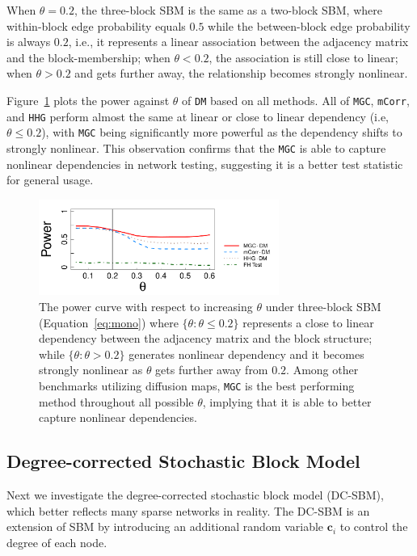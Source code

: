 \documentclass[12pt]{article}
\theoremstyle{definition}
\begin{document}
	When $\theta = 0.2$, the three-block SBM is the same as a two-block SBM, where within-block edge probability equals $0.5$ while the between-block edge probability is always $0.2$, i.e., it represents a linear association between the adjacency matrix and the block-membership; when $\theta<0.2$, the association is still close to linear; when $\theta > 0.2$ and gets further away, the relationship becomes strongly nonlinear.
	
	Figure~\ref{fig:powerplot} plots the power against $\theta$ of \texttt{DM} based on all methods. All of \texttt{MGC}, \texttt{mCorr}, and \texttt{HHG} perform almost the same at linear or close to linear dependency (i.e, $\theta \leq 0.2$), with \texttt{MGC} being significantly more powerful as the dependency shifts to strongly nonlinear. This observation confirms that the \texttt{MGC} is able to capture nonlinear dependencies in network testing, suggesting it is a better test statistic for general usage.
	
	\begin{figure}[ht]
		\centering
		\includegraphics[width=0.7\textwidth]{../Figure/monoelbow3_t3.pdf}
		\caption{The power curve with respect to increasing $\theta$ under three-block SBM (Equation~\ref{eq:mono}) where $\{\theta : \theta \leq 0.2 \}$ represents a close to linear dependency between the adjacency matrix and the block structure; while $\{ \theta : \theta > 0.2 \}$ generates nonlinear dependency and it becomes strongly nonlinear as $\theta$ gets further away from $0.2$. Among other benchmarks utilizing diffusion maps, \texttt{MGC} is the best performing method throughout all possible $\theta$, implying that it is able to better capture nonlinear dependencies.}
		\label{fig:powerplot}
	\end{figure}
	
	
	\subsection{Degree-corrected Stochastic Block Model}
	Next we investigate the degree-corrected stochastic block model (DC-SBM), which better reflects many sparse networks in reality. The DC-SBM is an extension of SBM by introducing an additional random variable $\mathbf{c}_{i}$ to control the degree of each node. 
	
\end{document}
